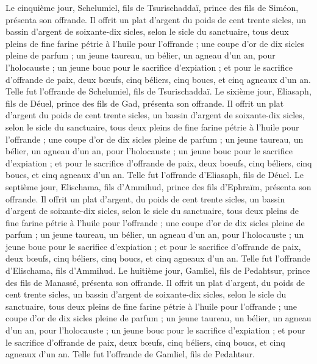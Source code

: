 \begin{multicols}{2}
Le cinquième jour, Schelumiel, fils de Tsurischaddaï, prince des fils de Siméon, présenta son offrande.
Il offrit un plat d'argent du poids de cent trente sicles, un bassin d'argent de soixante-dix sicles, selon le sicle du sanctuaire, tous deux pleins de fine farine pétrie à l'huile pour l’offrande ;
une coupe d'or de dix sicles pleine de parfum ;
un jeune taureau, un bélier, un agneau d'un an, pour l'holocauste ;
un jeune bouc pour le sacrifice d’expiation ;
et pour le sacrifice d’offrande de paix, deux bœufs, cinq béliers, cinq boucs, et cinq agneaux d'un an. Telle fut l'offrande de Schelumiel, fils de Tsurischaddaï.
Le sixième jour, Eliasaph, fils de Déuel, prince des fils de Gad, présenta son offrande.
Il offrit un plat d'argent du poids de cent trente sicles, un bassin d'argent de soixante-dix sicles, selon le sicle du sanctuaire, tous deux pleins de fine farine pétrie à l'huile pour l’offrande ;
une coupe d'or de dix sicles pleine de parfum ;
un jeune taureau, un bélier, un agneau d'un an, pour l'holocauste ;
un jeune bouc pour le sacrifice d’expiation ;
et pour le sacrifice d’offrande de paix, deux boeufs, cinq béliers, cinq boucs, et cinq agneaux d'un an. Telle fut l'offrande d'Eliasaph, fils de Déuel.
Le septième jour, Elischama, fils d’Ammihud, prince des fils d'Ephraïm, présenta son offrande.
Il offrit un plat d'argent, du poids de cent trente sicles, un bassin d'argent de soixante-dix sicles, selon le sicle du sanctuaire, tous deux pleins de fine farine pétrie à l'huile pour l’offrande ;
une coupe d'or de dix sicles pleine de parfum ;
un jeune taureau, un bélier, un agneau d'un an, pour l'holocauste ;
un jeune bouc pour le sacrifice d’expiation ;
et pour le sacrifice d’offrande de paix, deux bœufs, cinq béliers, cinq boucs, et cinq agneaux d'un an. Telle fut l'offrande d'Elischama, fils d’Ammihud.
Le huitième jour, Gamliel, fils de Pedahtsur, prince des fils de Manassé, présenta son offrande.
Il offrit un plat d'argent, du poids de cent trente sicles, un bassin d'argent de soixante-dix sicles, selon le sicle du sanctuaire, tous deux pleins de fine farine pétrie à l'huile pour l’offrande ;
une coupe d'or de dix sicles pleine de parfum ;
un jeune taureau, un bélier, un agneau d'un an, pour l'holocauste ;
un jeune bouc pour le sacrifice d’expiation ;
et pour le sacrifice d’offrande de paix, deux bœufs, cinq béliers, cinq boucs, et cinq agneaux d'un an. Telle fut l'offrande de Gamliel, fils de Pedahtsur.

\end{multicols}
